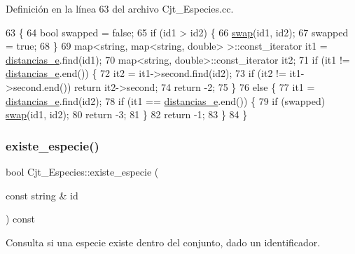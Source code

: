 Definición en la línea 63 del archivo Cjt\+\_\+\+Especies.\+cc.


\begin{DoxyCode}
63                                                                        \{
64   \textcolor{keywordtype}{bool} swapped = \textcolor{keyword}{false};
65   \textcolor{keywordflow}{if} (id1 > id2) \{
66     \hyperlink{_cjt___especies_8cc_aece33ee22015435a5dbac3d1f92ae2f5}{swap}(id1, id2);
67     swapped = \textcolor{keyword}{true};
68   \}
69   map<string, map<string, double> >::const\_iterator it1 = \hyperlink{class_cjt___especies_ad1c8837b7e76b9a7610b65209aa7f5e9}{distancias\_e}.find(id1);
70   map<string, double>::const\_iterator it2;
71   \textcolor{keywordflow}{if} (it1 != \hyperlink{class_cjt___especies_ad1c8837b7e76b9a7610b65209aa7f5e9}{distancias\_e}.end()) \{
72     it2 = it1->second.find(id2);
73     \textcolor{keywordflow}{if} (it2 != it1->second.end()) \textcolor{keywordflow}{return} it2->second;
74     \textcolor{keywordflow}{return} -2;
75   \}
76   \textcolor{keywordflow}{else} \{
77     it1 = \hyperlink{class_cjt___especies_ad1c8837b7e76b9a7610b65209aa7f5e9}{distancias\_e}.find(id2);
78     \textcolor{keywordflow}{if} (it1 == \hyperlink{class_cjt___especies_ad1c8837b7e76b9a7610b65209aa7f5e9}{distancias\_e}.end()) \{
79       \textcolor{keywordflow}{if} (swapped) \hyperlink{_cjt___especies_8cc_aece33ee22015435a5dbac3d1f92ae2f5}{swap}(id1, id2);
80       \textcolor{keywordflow}{return} -3;
81     \}
82     \textcolor{keywordflow}{return} -1;
83   \}
84 \}
\end{DoxyCode}
\mbox{\label{class_cjt___especies_aeb58e5bc1d68b0a7ab59f24e4a99057f}} 
\subsubsection{\texorpdfstring{existe\+\_\+especie()}{existe\_especie()}}
{\footnotesize\ttfamily bool Cjt\+\_\+\+Especies\+::existe\+\_\+especie (\begin{DoxyParamCaption}\item[{const string \&}]{id }\end{DoxyParamCaption}) const}



Consulta si una especie existe dentro del conjunto, dado un identificador. 

